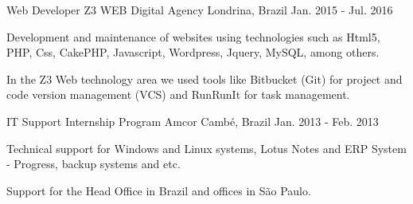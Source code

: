 \begin{cventries}
  \cventry
    {Web Developer} %
    {Z3 WEB Digital Agency} %
    {Londrina, Brazil} %
    {Jan. 2015 - Jul. 2016} %
    {
      \begin{cvitems} %
        \item {Development and maintenance of websites using technologies such as Html5, PHP, Css, CakePHP, Javascript, Wordpress, Jquery, MySQL, among others.}
\item {In the Z3 Web technology area we used tools like Bitbucket (Git) for project and code version management (VCS) and RunRunIt for task management.}
      \end{cvitems}
    }

  \cventry
    {IT Support Internship Program} %
    {Amcor} %
    {Cambé, Brazil} %
    {Jan. 2013 - Feb. 2013} %
    {
      \begin{cvitems} %
        \item {Technical support for Windows and Linux systems, Lotus Notes and ERP System - Progress, backup systems and etc.}
        \item {Support for the Head Office in Brazil and offices in São Paulo.}
      \end{cvitems}
    }

\end{cventries}

